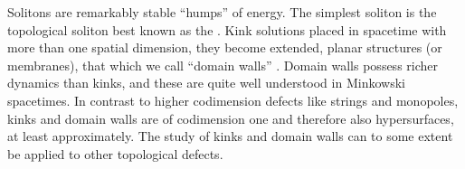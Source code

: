 







 

{Solitons} are remarkably stable ``humps'' of energy. The simplest soliton is the topological soliton best known as the . 
Kink solutions placed in spacetime with more than one spatial dimension, they become extended, planar structures (or membranes), that which we call ``domain walls'' \cite{vachaspatiKinksDomainWalls2006}. 
Domain walls possess richer dynamics than kinks, and these are quite well understood in Minkowski spacetimes. %
In contrast to higher codimension defects like strings and monopoles, kinks and domain walls are of codimension one and therefore also hypersurfaces, at least approximately. 
The study of kinks and domain walls can to some extent be applied to other topological defects.


















